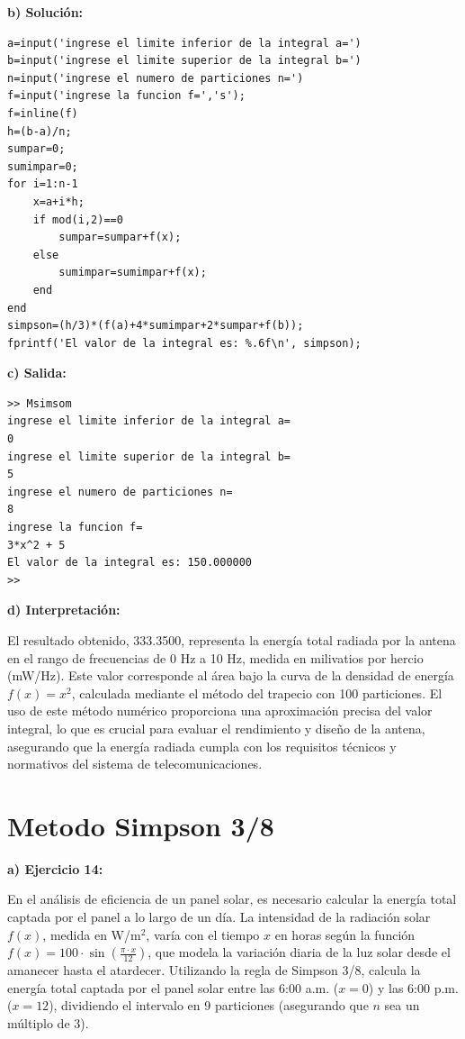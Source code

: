 \documentclass[12pt,a4paper,twoside]{article}  %
\begin{document}
\textbf{b) Solución:}

\begin{lstlisting}
a=input('ingrese el limite inferior de la integral a=')
b=input('ingrese el limite superior de la integral b=')
n=input('ingrese el numero de particiones n=')
f=input('ingrese la funcion f=','s');
f=inline(f)
h=(b-a)/n;
sumpar=0;
sumimpar=0;
for i=1:n-1
    x=a+i*h;
    if mod(i,2)==0
        sumpar=sumpar+f(x);
    else
        sumimpar=sumimpar+f(x);
    end 
end
simpson=(h/3)*(f(a)+4*sumimpar+2*sumpar+f(b));
fprintf('El valor de la integral es: %.6f\n', simpson);
\end{lstlisting}

\textbf{c) Salida:}

\begin{verbatim}
>> Msimsom
ingrese el limite inferior de la integral a=
0
ingrese el limite superior de la integral b=
5
ingrese el numero de particiones n=
8
ingrese la funcion f=
3*x^2 + 5
El valor de la integral es: 150.000000
>> 
\end{verbatim}

\textbf{d) Interpretación:}

El resultado obtenido, 333.3500, representa la energía total radiada por la antena en el rango de frecuencias de 0 Hz a 10 Hz, medida en milivatios por hercio (mW/Hz). Este valor corresponde al área bajo la curva de la densidad de energía \( f(x) = x^2 \), calculada mediante el método del trapecio con 100 particiones. El uso de este método numérico proporciona una aproximación precisa del valor integral, lo que es crucial para evaluar el rendimiento y diseño de la antena, asegurando que la energía radiada cumpla con los requisitos técnicos y normativos del sistema de telecomunicaciones.

\section{Metodo Simpson 3/8}


\textbf{a) Ejercicio 14: }

En el análisis de eficiencia de un panel solar, es necesario calcular la energía total captada por el panel a lo largo de un día. La intensidad de la radiación solar \( f(x) \), medida en W/m\(^2\), varía con el tiempo \( x \) en horas según la función \( f(x) = 100 \cdot \sin\left(\frac{\pi \cdot x}{12}\right) \), que modela la variación diaria de la luz solar desde el amanecer hasta el atardecer. Utilizando la regla de Simpson 3/8, calcula la energía total captada por el panel solar entre las 6:00 a.m. (\( x = 0 \)) y las 6:00 p.m. (\( x = 12 \)), dividiendo el intervalo en 9 particiones (asegurando que \( n \) sea un múltiplo de 3).
\end{document}
